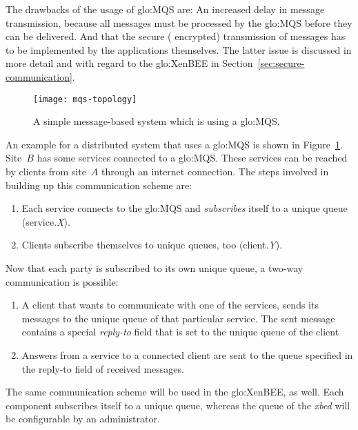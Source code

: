 The drawbacks  of the  usage of \gls{glo:MQS}  are: An increased  delay in
message  transmission,  because all  messages  must  be  processed by  the
\gls{glo:MQS}  before they  can be  delivered.  And  that the  secure (\ie
encrypted)  transmission  of  messages   has  to  be  implemented  by  the
applications themselves.  The latter issue is discussed in more detail and
with        regard         to        the        \gls{glo:XenBEE}        in
Section~\ref{sec:secure-communication}.

\begin{figure}[htbp]
  \centering
  \texttt{[image: mqs-topology]}
  \caption[Example  MQS topology]{A simple  message-based system  which is
    using a \gls{glo:MQS}.}
  \label{fig:mqs-topology}
\end{figure}

An example for a distributed system  that uses a \gls{glo:MQS} is shown in
Figure~\ref{fig:mqs-topology}.  Site~$B$ has  some services connected to a
\gls{glo:MQS}.   These services can  be reached  by clients  from site~$A$
through an  internet connection.  The  steps involved in building  up this
communication scheme are:
\begin{enumerate}
\item  Each service  connects to  the \gls{glo:MQS}  and \emph{subscribes}
  itself to a unique queue (\eg service.\emph{X}).
\item    Clients   subscribe    themselves   to    unique    queues,   too
  (\eg client.\emph{Y}).
\end{enumerate}

Now  that each  party is  subscribed to  its own  unique queue,  a two-way
communication is possible:
\begin{enumerate}
\item A client  that wants to communicate with one  of the services, sends
  its messages  to the unique queue  of that particular  service. The sent
  message  contains a  special \emph{reply-to}  field that  is set  to the
  unique queue of the client
\item Answers from  a service to a connected client are  sent to the queue
  specified in the reply-to field of received messages.
\end{enumerate}

The same  communication scheme  will be used  in the  \gls{glo:XenBEE}, as
well.  Each  component subscribes  itself to a  unique queue,  whereas the
queue of the \emph{xbed} will be configurable by an administrator.

